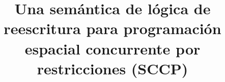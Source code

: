 \title{Una sem\'antica de l\'ogica de reescritura para programaci\'on espacial concurrente por restricciones (SCCP)}




